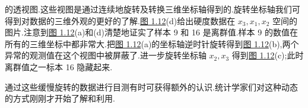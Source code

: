 
\begin{mvfigure}
\label{fig:1.11}
\end{mvfigure}

的透视图.这些视图是通过连续地旋转及转换三维坐标轴得到的.旋转坐标轴我们可得到对数据的三维外观的更好的了解.\hyperref[fig:1.12]{图 1.12}(d)给出硬度数据在 $x_3, x_1, x_2$ 空间的图片.注意到\hyperref[fig:1.12]{图 1.12}(a)和(d)清楚地证实了样本 9 和 16 是离群值.样本 9 的数值在所有的三维坐标中都非常大.把\hyperref[fig:1.12]{图 1.12}(a)的坐标轴逆时针旋转得到\hyperref[fig:1.12]{图 1.12}(b),两个异常的观测值在这个视图中被屏蔽了.进一步旋转坐标轴 $x_2, x_3$ 得到\hyperref[fig:1.12]{图 1.12}(c);此时离群值之一标本 16 隐藏起来.

通过这些缓慢旋转的数据进行目测有时可获得额外的认识.统计学家们对这种动态的方式刚刚才开始了解和利用.
